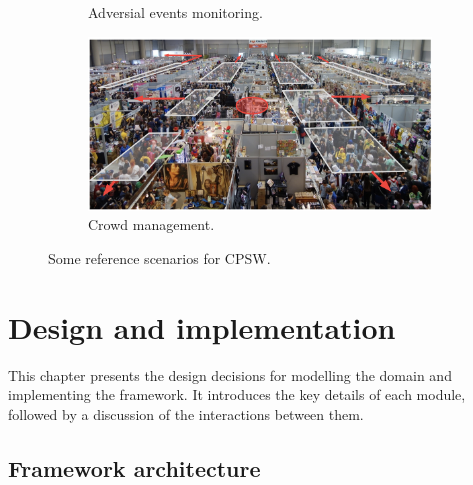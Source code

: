 \documentclass[12pt,a4paper,openright,twoside]{book}
\newcommand{\fonte}[1]{{\color{gray} \small \hypersetup{citecolor=gray} Source: #1}}
\begin{document}
\begin{figure}[t]
\begin{subfigure}[b]{0.49\textwidth}
        \caption{Adversial events monitoring.}
        \label{fig:cpsw21}
    \end{subfigure}
    \begin{subfigure}[b]{0.49\textwidth}
        \centering
        \includegraphics[width=\textwidth]{figures/cpsw-3.png}
        \caption{Crowd management.}
        \label{fig:cpsw3}
    \end{subfigure}
    \caption{Some reference scenarios for CPSW.}\vspace{-10pt}
    \label{fig:scenarios}
\end{figure}


\chapter{Design and implementation} 
\label{chap:impl-design}

This chapter presents the design decisions for modelling the domain and implementing 
    the framework. It introduces the key details of each module, followed by a discussion
    of the interactions between them.

\section{Framework architecture}
\end{document}
